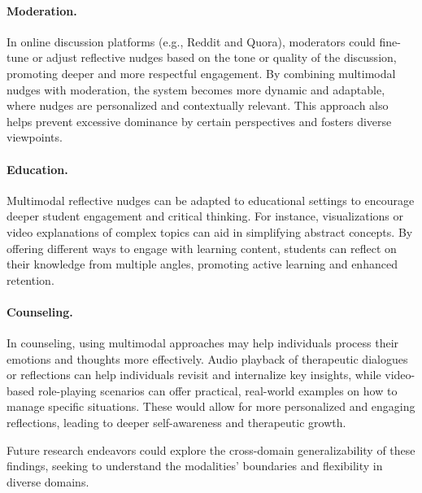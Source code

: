 \paragraph{Moderation.} In online discussion platforms (e.g., Reddit and Quora), moderators could fine-tune or adjust reflective nudges based on the tone or quality of the discussion, promoting deeper and more respectful engagement. By combining multimodal nudges with moderation, the system becomes more dynamic and adaptable, where nudges are personalized and contextually relevant. This approach also helps prevent excessive dominance by certain perspectives and fosters diverse viewpoints.

\paragraph{Education.} Multimodal reflective nudges can be adapted to educational settings to encourage deeper student engagement and critical thinking. For instance, visualizations or video explanations of complex topics can aid in simplifying abstract concepts. By offering different ways to engage with learning content, students can reflect on their knowledge from multiple angles, promoting active learning and enhanced retention. 

\paragraph{Counseling.} In counseling, using multimodal approaches may help individuals process their emotions and thoughts more effectively. Audio playback of therapeutic dialogues or reflections can help individuals revisit and internalize key insights, while video-based role-playing scenarios can offer practical, real-world examples on how to manage specific situations. These would allow for more personalized and engaging reflections, leading to deeper self-awareness and therapeutic growth.

Future research endeavors could explore the cross-domain generalizability of these findings, seeking to understand the modalities' boundaries and flexibility in diverse domains.